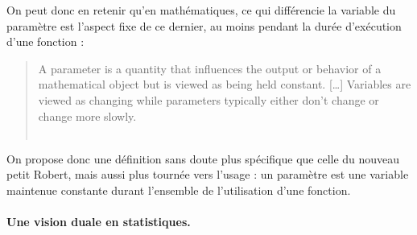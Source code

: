 On peut donc en retenir qu'en mathématiques, ce qui différencie la variable du paramètre est l'aspect fixe de ce dernier, au moins pendant la durée d'exécution d'une fonction : 
\begin{quotation}
	\noindent \og
	A parameter is a quantity that influences the output or behavior of a mathematical object but is viewed as being held constant. [\dots]
	Variables are viewed as changing while parameters typically either don't change or change more slowly.
	\fg{}\\
	\mbox{}~ \hfill \autocite{nykamp_parameter_2015}
\end{quotation}


On propose donc une définition sans doute plus spécifique que celle du nouveau petit Robert, mais aussi plus tournée vers l'usage : un paramètre est une variable maintenue constante durant l'ensemble de l'utilisation d'une fonction.

\paragraph{Une vision duale en statistiques.}

